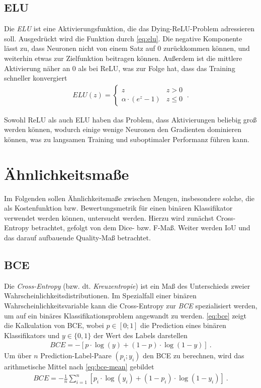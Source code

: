 \subsection{\acf{ELU}} \label{sec:activation:elu}

Die \textit{\acf{ELU}} ist eine Aktivierungsfunktion, die das Dying-\ac{ReLU}-Problem adressieren soll. 
Ausgedrückt wird die Funktion durch \autoref{eq:elu}. Die negative Komponente lässt zu, dass Neuronen nicht 
von einem Satz auf $0$ zurückkommen können, und weiterhin etwas zur Zielfunktion beitragen können. Außerdem ist die mittlere 
Aktivierung näher an $0$ als bei \ac{ReLU}, was zur Folge hat, dass das Training schneller konvergiert \cite{Clevert.23112015}
\begin{align}
	\label{eq:elu} ELU(z) = \begin{cases} 
		z & z > 0 \\
		\alpha \cdot (e^z - 1) & z \leq 0 
	\end{cases} ~.
\end{align}

Sowohl \ac{ReLU} als auch \ac{ELU} haben das Problem, dass Aktivierungen beliebig groß werden können, 
wodurch einige wenige Neuronen den Gradienten dominieren können, was zu langsamen Training und suboptimaler Performanz führen kann. 


\section{Ähnlichkeitsmaße} \label{sec:evaluation-metrics}

Im Folgenden sollen Ähnlichkeitsmaße zwischen Mengen, insbesondere 
solche, die als Kostenfunktion bzw. Bewertungsmetrik für einen binären 
Klassifikator verwendet werden können, untersucht werden. Hierzu wird zunächst Cross-Entropy betrachtet,
gefolgt von dem Dice- bzw. F-Maß. Weiter werden \ac{IoU} und das darauf aufbauende Quality-Maß betrachtet.

\subsection{\acf{BCE}}

Die \textit{Cross-Entropy} (bzw. dt. \textit{Kreuzentropie}) ist ein Maß des Unterschieds zweier
Wahrscheinlichkeitsdistributionen. Im Spezialfall einer binären Wahrscheinlichkeitsvariable 
kann die Cross-Entropy zur \textit{\acf{BCE}} spezialisiert werden, um auf ein binäres 
Klassifikationsproblem angewandt zu werden. 
\autoref{eq:bce} zeigt die Kalkulation von \ac{BCE}, wobei $p \in [0;1]$ die Prediction 
eines binären Klassifikators und $y \in \{0,1\}$ der Wert des Labels darstellen
\begin{align}
	\label{eq:bce} BCE = -[p \cdot \log(y) + (1-p) \cdot \log(1-y) ]~.
\end{align} 
Um über $n$ Prediction-Label-Paare $(p_i; y_i)$ den \ac{BCE} zu berechnen, wird das arithmetische Mittel nach
\autoref{eq:bce-mean} gebildet \cites{Cybenko.1999}{Murphy.2012}
\begin{align}
	\label{eq:bce-mean} BCE = -\frac{1}{n}\sum_{i = 1}^{n}[p_i \cdot \log(y_i) + (1-p_i) \cdot \log(1-y_i) ]~.
\end{align}


